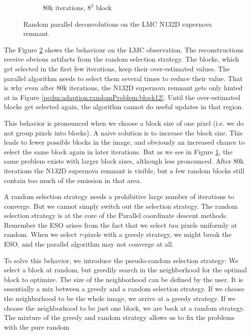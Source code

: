 \begin{figure}[h]
\begin{subfigure}[b]{0.2405\linewidth}
		\caption{80k iterations, $8^2$ block}
		\label{pcdm:adaption:randomProblem:block82}
	\end{subfigure}
	\caption{Random parallel deconvolutions on the LMC N132D supernova remnant.}
	\label{pcdm:adaption:randomProblem}
\end{figure}

The Figure \ref{pcdm:adaption:randomProblem} shows the behaviour on the LMC observation. The reconstructions receive obvious artifacts from the random selection strategy. The blocks, which get selected in the first few iterations, keep their over-estimated values. The parallel algorithm needs to select them several times to reduce their value. That is why even after 80k iterations, the N132D supernova remnant gets only hinted at in Figure \ref{pcdm:adaption:randomProblem:block12}. Until the over-estimated blocks get selected again, the algorithm cannot do useful updates in that region.

This behavior is pronounced when we choose a block size of one pixel (i.e. we do not group pixels into blocks). A naive solution is to increase the block size. This leads to fewer possible blocks in the image, and obviously an increased chance to select the same block again in later iterations. But as we see in Figure \ref{pcdm:adaption:randomProblem:block82}, the same problem exists with larger block sizes, although less pronounced. After 80k iterations the N132D supernova remnant is visible, but a few random blocks still contain too much of the emission in that area.

A random selection strategy needs a prohibitive large number of iterations to converge. But we cannot simply switch out the selection strategy. The random selection strategy is at the core of the Parallel coordinate descent methods. Remember the ESO arises from the fact that we select $tau$ pixels uniformly at random. When we select $\tau$-pixels with a greedy strategy, we might break the ESO, and the parallel algorithm may not converge at all.

To solve this behavior, we introduce the pseudo-random selection strategy:  We select a block at random, but greedily search in the neighborhood for the optimal block to optimize. The size of the neighborhood can be defined by the user. It is essentially a mix between a greedy and a random selection strategy. If we choose the neighborhood to be the whole image, we arrive at a greedy strategy. If we choose the neighborhood to be just one block, we are back at a random strategy. The mixture of the greedy and random strategy allows us to fix the problems with the pure random

